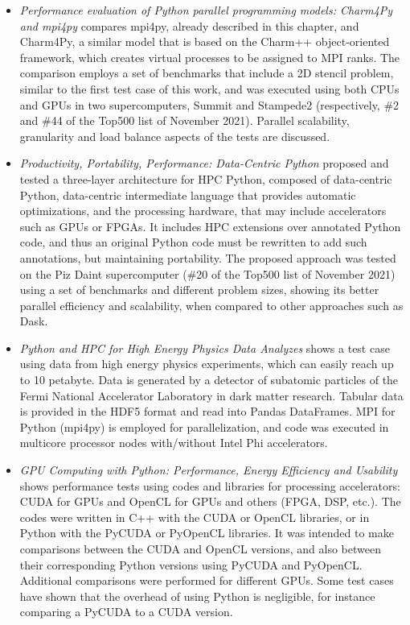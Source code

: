 \begin{itemize}
\item \textit {Performance evaluation of Python parallel programming models: Charm4Py and mpi4py} \cite {Fink2021} compares mpi4py, already described in this chapter, and Charm4Py, a similar model that is based on the Charm++ object-oriented framework, which creates virtual processes to be assigned to MPI ranks. The comparison employs a set of benchmarks that include a 2D stencil problem, similar to the first test case of this work, and was executed using both CPUs and GPUs in two supercomputers, Summit and Stampede2 (respectively, \#2 and \#44 of the Top500 list of November 2021). Parallel scalability, granularity and load balance aspects of the tests are discussed.

\item \textit {Productivity, Portability, Performance: Data-Centric Python} \cite {Ziogas2021} proposed and tested a three-layer architecture for HPC Python, composed of data-centric Python, data-centric intermediate language that provides automatic optimizations, and the processing hardware, that may include accelerators such as GPUs or FPGAs. It includes HPC extensions over annotated Python code, and thus an original Python code must be rewritten to add such annotations, but maintaining portability. The proposed approach was tested on the Piz Daint supercomputer (\#20 of the Top500 list of November 2021) using a set of benchmarks and different problem sizes, showing its better parallel efficiency and scalability, when compared to other approaches such as Dask.  

\item \textit {Python and HPC for High Energy Physics Data Analyzes} \cite {Sehrish2017} shows a test case using data from high energy physics experiments, which can easily reach up to 10 petabyte. Data is generated by a detector of subatomic particles of the Fermi National Accelerator Laboratory in dark matter research. Tabular data is provided in the HDF5 format and read into Pandas DataFrames. MPI for Python (mpi4py) is employed for parallelization, and code was executed in multicore processor nodes with/without Intel Phi accelerators.

\item \textit {GPU Computing with Python: Performance, Energy Efficiency and Usability} \cite {Holm2020} shows performance tests using codes and libraries for processing accelerators: CUDA for GPUs and OpenCL for GPUs and others (FPGA, DSP, etc.). The codes were written in C++ with the CUDA or OpenCL libraries, or in Python with the PyCUDA or PyOpenCL libraries. It was intended to make comparisons between the CUDA and OpenCL versions, and also between their corresponding Python versions using PyCUDA and PyOpenCL. Additional comparisons were performed for different GPUs. Some test cases have shown that the overhead of using Python is negligible, for instance comparing a PyCUDA to a CUDA version.


\end{itemize}
